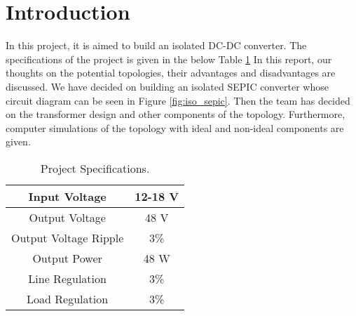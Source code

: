 \section{Introduction}
In this project, it is aimed to build an isolated DC-DC converter. The specifications of the project is given in the below Table \ref{tab:project_specs} In this report, our thoughts on the potential topologies, their advantages and disadvantages are discussed. We have decided on building an isolated SEPIC converter whose circuit diagram can be seen in Figure \ref{fig:iso_sepic}. Then the team has decided on the transformer design and other components of the topology. Furthermore, computer simulations of the topology with ideal and non-ideal components are given.

\begin{table}[H]
    \centering
    \caption{Project Specifications.}
    \label{tab:project_specs}
    \begin{tabular}{|c|c|}
        \hline
        Input Voltage               & 12-18 V   \\
        \hline
        Output Voltage              & 48 V      \\
        \hline
        Output Voltage Ripple       & 3\%       \\  
        \hline
        Output Power                & 48 W      \\
        \hline
        Line Regulation             & 3\%       \\
        \hline
        Load Regulation             & 3\%       \\
        \hline
    \end{tabular}
\end{table}